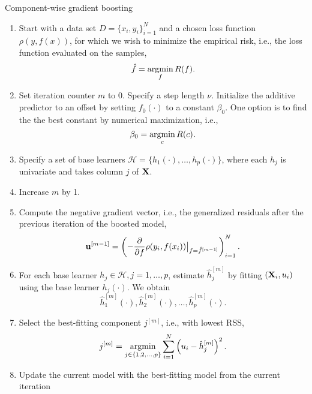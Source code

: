 \begin{algorithm}
\caption{Component-wise gradient boosting}\label{algo:component-wise}
\begin{enumerate}
    \item Start with a data set $D=\{x_i, y_i\}_{i=1}^N$ and a chosen loss function $\rho(y,f(x))$, for which we wish to
        minimize the empirical risk, i.e., the loss function evaluated on the samples,
        \begin{equation}
            \hat{f}=\operatorname*{argmin}_{f}R(f).
        \end{equation}
    \item Set iteration counter $m$ to 0. Specify a step length $\nu$. Initialize the additive predictor to an offset by setting $f_0(\cdot)$ to a constant $\beta_0$. One option is to find the the best constant by numerical maximization, i.e.,
        \begin{equation}
            \beta_0=\operatorname*{argmin}_c R(c).
        \end{equation}
    \item Specify a set of base learners $\mathcal{H}=\{h_1(\cdot),\dotsc,h_p(\cdot)\}$, where each $h_j$ is univariate and takes column $j$ of $\mathbf{X}$.
    \item\label{first-step} Increase $m$ by 1.
    \item Compute the negative gradient vector, i.e., the generalized residuals after the previous iteration of the boosted model,
        \begin{equation}
            \mathbf{u}^{[m-1]}=\left(-\frac{\partial}{\partial f}\rho(y_i, f(x_i))\big\rvert_{f=\hat{f}^{[m-1]}}\right)_{i=1}^N.
        \end{equation}
    \item For each base learner $h_j\in\mathcal{H},j=1,\ldots,p$, estimate $\hat{h}_{j}^{[m]}$ by fitting $(\mathbf{X}_i,u_i)$ using the base learner $h_j(\cdot)$. We obtain
        \begin{equation}
            \hat{h}_1^{[m]}(\cdot),\hat{h}_2^{[m]}(\cdot),\ldots,\hat{h}_p^{[m]}(\cdot).
        \end{equation}
    \item Select the best-fitting component $j^{[m]}$, i.e., with lowest RSS,
        \begin{equation}
            j^{[m]}=\operatorname*{argmin}_{j\in\{1,2,\ldots,p\}}\sum_{i=1}^N \left(u_i-\hat{h}_j^{[m]}\right)^2.
        \end{equation}
    \item\label{last-step} Update the current model with the best-fitting model from the current iteration

\end{enumerate}
\end{algorithm}
